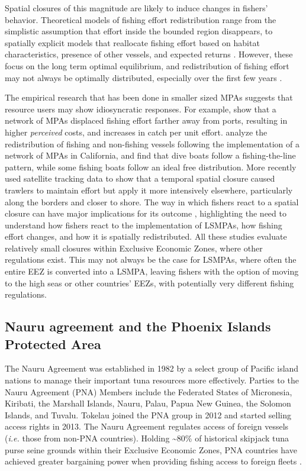 \documentclass[9pt,twoside,lineno]{pnas-new}
\begin{document}
Spatial closures of this magnitude are likely to induce changes in
fishers' behavior. Theoretical models of fishing effort redistribution
range from the simplistic assumption that effort inside the bounded
region disappears, to spatially explicit models that reallocate fishing
effort based on habitat characteristics, presence of other vessels, and
expected returns \citep{smith_2003,hilborn_2006}. However, these focus
on the long term optimal equilibrium, and redistribution of fishing
effort may not always be optimally distributed, especially over the first few years
\citep{stevenson_2013}.

The empirical research that has been done in smaller sized MPAs
suggests that resource users may show idiosyncratic responses. For
example, \cite{stevenson_2013} show that a network of MPAs displaced
fishing effort farther away from ports, resulting in higher
\emph{perceived} costs, and increases in catch per unit effort.
\cite{cabral_2017} analyze the redistribution of fishing and
non-fishing vessels following the implementation of a network of MPAs in
California, and find that dive boats follow a
fishing-the-line pattern, while some fishing boats follow an ideal free
distribution. More recently \cite{elahi_2018} used satellite tracking
data to show that a temporal spatial closure caused trawlers to maintain
effort but apply it more intensively elsewhere, particularly along the
borders and closer to shore. The way in which fishers react to a spatial
closure can have major implications for its outcome
\citep{smith_2003,hilborn_2006}, highlighting the need to understand how
fishers react to the implementation of LSMPAs, how fishing effort
changes, and how it is spatially redistributed. All these studies evaluate relatively small closures within Exclusive Economic Zones, where other regulations exist.
This may not always be the case for LSMPAs, where often the entire EEZ
is converted into a LSMPA, leaving fishers with the option of moving to
the high seas or other countries' EEZs, with potentially very different fishing regulations.

\subsection{Nauru agreement and the Phoenix Islands Protected Area}
\label{nauru-agreement-and-the-phoenix-island-protected-area}

The Nauru Agreement was established in 1982 by a select group of Pacific
island nations to manage their important tuna resources more effectively.
Parties to the Nauru Agreement (PNA) Members
include the Federated States of Micronesia, Kiribati, the Marshall Islands,
Nauru, Palau, Papua New Guinea, the Solomon Islands, and Tuvalu.
Tokelau joined the PNA group in 2012 and started selling access rights in 2013. The Nauru
Agreement regulates access of foreign vessels (\emph{i.e.} those from
non-PNA countries). Holding \textasciitilde{}80\% of historical
skipjack tuna purse seine grounds within their Exclusive Economic Zones, PNA
countries have achieved greater bargaining power when providing fishing access to foreign
fleets \cite{havice_2010}.
\end{document}
